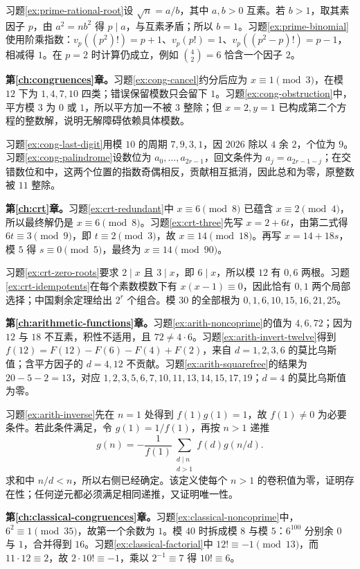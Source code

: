 \documentclass[UTF8,12pt,a4paper,fontset=fandol]{ctexbook}
\begin{document}
习题\ref{ex:prime-rational-root}设 $\sqrt n=a/b$，其中 $a,b>0$ 互素。若 $b>1$，取其素因子 $p$，由 $a^2=nb^2$ 得 $p\mid a$，与互素矛盾；所以 $b=1$。习题\ref{ex:prime-binomial}使用阶乘指数：$v_p((p^2)!)=p+1$、$v_p(p!)=1$、$v_p((p^2-p)!)=p-1$，相减得 $1$。在 $p=2$ 时计算仍成立，例如 $\binom42=6$ 恰含一个因子 $2$。

\textbf{第\ref{ch:congruences}章。}习题\ref{ex:cong-cancel}约分后应为 $x\equiv1\pmod3$，在模 $12$ 下为 $1,4,7,10$ 四类；错误保留模数只会留下 $1$。习题\ref{ex:cong-obstruction}中，平方模 $3$ 为 $0$ 或 $1$，所以平方加一不被 $3$ 整除；但 $x=2,y=1$ 已构成第二个方程的整数解，说明无解障碍依赖具体模数。

习题\ref{ex:cong-last-digit}用模 $10$ 的周期 $7,9,3,1$，因 $2026$ 除以 $4$ 余 $2$，个位为 $9$。习题\ref{ex:cong-palindrome}设数位为 $a_0,\ldots,a_{2r-1}$，回文条件为 $a_j=a_{2r-1-j}$；在交错数位和中，这两个位置的指数奇偶相反，贡献相互抵消，因此总和为零，原整数被 $11$ 整除。

\textbf{第\ref{ch:crt}章。}习题\ref{ex:crt-redundant}中 $x\equiv6\pmod8$ 已蕴含 $x\equiv2\pmod4$，所以最终解仍是 $x\equiv6\pmod8$。习题\ref{ex:crt-three}先写 $x=2+6t$，由第二式得 $6t\equiv3\pmod9$，即 $t\equiv2\pmod3$，故 $x\equiv14\pmod{18}$。再写 $x=14+18s$，模 $5$ 得 $s\equiv0\pmod5$，最终为 $x\equiv14\pmod{90}$。

习题\ref{ex:crt-zero-roots}要求 $2\mid x$ 且 $3\mid x$，即 $6\mid x$，所以模 $12$ 有 $0,6$ 两根。习题\ref{ex:crt-idempotents}在每个素数模数下有 $x(x-1)\equiv0$，因此恰有 $0,1$ 两个局部选择；中国剩余定理给出 $2^r$ 个组合。模 $30$ 的全部根为 $0,1,6,10,15,16,21,25$。

\textbf{第\ref{ch:arithmetic-functions}章。}习题\ref{ex:arith-noncoprime}的值为 $4,6,72$；因为 $12$ 与 $18$ 不互素，积性不适用，且 $72\ne4\cdot6$。习题\ref{ex:arith-invert-twelve}得到 $f(12)=F(12)-F(6)-F(4)+F(2)$，来自 $d=1,2,3,6$ 的莫比乌斯值；含平方因子的 $d=4,12$ 不贡献。习题\ref{ex:arith-squarefree}的结果为 $20-5-2=13$，对应 $1,2,3,5,6,7,10,11,13,14,15,17,19$；$d=4$ 的莫比乌斯值为零。

习题\ref{ex:arith-inverse}先在 $n=1$ 处得到 $f(1)g(1)=1$，故 $f(1)\ne0$ 为必要条件。若此条件满足，令 $g(1)=1/f(1)$，再按 $n>1$ 递推
\[
 g(n)=-\frac1{f(1)}\sum_{\substack{d\mid n\\d>1}}f(d)g(n/d).
\]
求和中 $n/d<n$，所以右侧已经确定。该定义使每个 $n>1$ 的卷积值为零，证明存在性；任何逆元都必须满足相同递推，又证明唯一性。

\textbf{第\ref{ch:classical-congruences}章。}习题\ref{ex:classical-noncoprime}中，$6^2\equiv1\pmod{35}$，故第一个余数为 $1$。模 $40$ 时拆成模 $8$ 与模 $5$：$6^{100}$ 分别余 $0$ 与 $1$，合并得到 $16$。习题\ref{ex:classical-factorial}中 $12!\equiv-1\pmod{13}$，而 $11\cdot12\equiv2$，故 $2\cdot10!\equiv-1$，乘以 $2^{-1}\equiv7$ 得 $10!\equiv6$。
\end{document}
